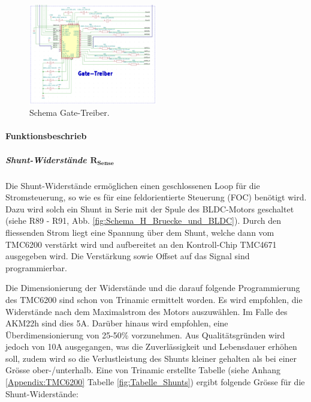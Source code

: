 \begin{figure}[h!]
	\centering
	\includegraphics[width=0.5\textwidth]{graphics/Schema_Gate_Treiber}
	\caption{Schema Gate-Treiber.}
	\label{fig:Schema_Gate_Treiber}
\end{figure}

\paragraph{Funktionsbeschrieb}\mbox{}

\subparagraph{Shunt-Widerstände $\mathrm{\mathbf{R_{Sense}}}$}
Die Shunt-Widerstände ermöglichen einen geschlossenen Loop für die Stromsteuerung, so wie es für eine feldorientierte Steuerung (FOC) benötigt wird. Dazu wird solch ein Shunt in Serie mit der Spule des BLDC-Motors geschaltet (siehe R89 - R91, Abb. \ref{fig:Schema_H_Bruecke_und_BLDC}). Durch den fliessenden Strom liegt eine Spannung über dem Shunt, welche dann vom TMC6200 verstärkt wird und aufbereitet an den Kontroll-Chip TMC4671 ausgegeben wird. Die Verstärkung sowie Offset auf das Signal sind programmierbar.

Die Dimensionierung der Widerstände und die darauf folgende Programmierung des TMC6200 sind schon von Trinamic ermittelt worden. Es wird empfohlen, die Widerstände nach dem Maximalstrom des Motors auszuwählen. Im Falle des AKM22h sind dies 5A. Darüber hinaus wird empfohlen, eine Überdimensionierung von 25-50\% vorzunehmen. Aus Qualitätsgründen wird jedoch von 10A ausgegangen, was die Zuverlässigkeit und Lebensdauer erhöhen soll, zudem wird so die Verlustleistung des Shunts kleiner gehalten als bei einer Grösse ober-/unterhalb. Eine von Trinamic erstellte Tabelle (siehe Anhang \ref{Appendix:TMC6200} Tabelle \ref{fig:Tabelle_Shunts}) ergibt folgende Grösse für die Shunt-Widerstände: \cite[S.31]{trinamic_tmc6200_datasheet_2013}

